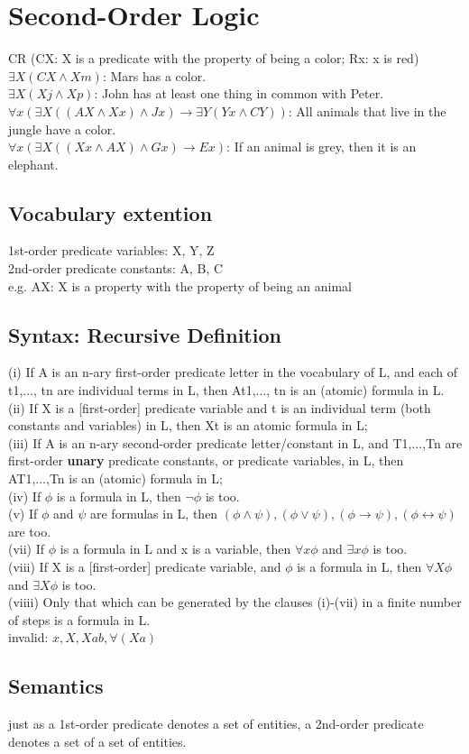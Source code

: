 \section{Second-Order Logic}
{\scriptsize CR (CX: X is a predicate with the property of being a color; Rx: x is red) \\
$\exists X(CX \land Xm)$: Mars has a color. \\
$\exists X(Xj \land Xp)$: John has at least one thing in common with Peter. \\
$\forall x (\exists X ((AX \land Xx) \land Jx) \to \exists Y (Yx \land CY))$: All animals that live in the jungle have a color.\\
$\forall x (\exists X ((Xx \land AX) \land Gx) \to Ex)$: If an animal is grey, then it is an elephant.}
\subsection*{Vocabulary extention}
{\scriptsize 1st-order predicate variables: X, Y, Z\\
2nd-order predicate constants: A, B, C\\
e.g. AX: X is a property with the property of being an animal}
\subsection*{Syntax: Recursive Definition}
{\scriptsize (i) If A is an n-ary first-order predicate letter in the vocabulary of L, and each of t1,..., tn are individual terms in L, then At1,..., tn is an (atomic) formula in L.\\
(ii) If X is a [first-order] predicate variable and t is an individual term (both constants and variables) in L, then Xt is an atomic formula in L;\\
(iii) If A is an n-ary second-order predicate letter/constant in L, and
T1,...,Tn are first-order \textbf{unary} predicate constants, or predicate
variables, in L, then AT1,...,Tn is an (atomic) formula in L;\\
(iv) If $\phi$ is a formula in L, then $\neg \phi$ is too.\\
(v) If $\phi$ and $\psi$ are formulas in L, then $(\phi \land \psi), (\phi \lor \psi), (\phi \to \psi), (\phi \leftrightarrow \psi)$ are too.\\
(vii) If $\phi$ is a formula in L and x is a variable, then $\forall x \phi$ and $\exists x \phi$ is too.\\
(viii) If X is a [first-order] predicate variable, and $\phi$ is a formula in L, then $\forall X \phi$ and $\exists X \phi$ is too.\\
(viiii) Only that which can be generated by the clauses (i)-(vii) in a finite number of steps is a formula in L.\\}
invalid: $x, X, Xab, \forall(Xa)$
\subsection*{Semantics}
{\scriptsize just as a 1st-order predicate denotes a set of entities, a 2nd-order predicate denotes a set of a set of entities.}